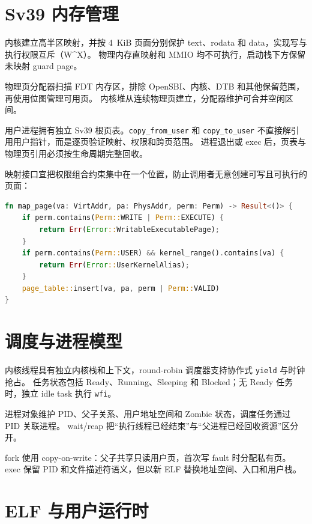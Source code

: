\section{Sv39 内存管理}

内核建立高半区映射，并按 4~KiB 页面分别保护 text、rodata 和 data，实现写与执行权限互斥（W\textasciicircum X）。
物理内存直映射和 MMIO 均不可执行，启动栈下方保留未映射 guard page。

物理页分配器扫描 FDT 内存区，排除 OpenSBI、内核、DTB 和其他保留范围，再使用位图管理可用页。
内核堆从连续物理页建立，分配器维护可合并空闲区间。

用户进程拥有独立 Sv39 根页表。\texttt{copy\_from\_user} 和 \texttt{copy\_to\_user} 不直接解引用用户指针，而是逐页验证映射、权限和跨页范围。
进程退出或 exec 后，页表与物理页引用必须按生命周期完整回收。

映射接口宜把权限组合约束集中在一个位置，防止调用者无意创建可写且可执行的页面：

\begin{lstlisting}[language=Rust,caption={页映射权限的集中校验（简化代码）}]
fn map_page(va: VirtAddr, pa: PhysAddr, perm: Perm) -> Result<()> {
    if perm.contains(Perm::WRITE | Perm::EXECUTE) {
        return Err(Error::WritableExecutablePage);
    }
    if perm.contains(Perm::USER) && kernel_range().contains(va) {
        return Err(Error::UserKernelAlias);
    }
    page_table::insert(va, pa, perm | Perm::VALID)
}
\end{lstlisting}

\section{调度与进程模型}

内核线程具有独立内核栈和上下文，round-robin 调度器支持协作式 \texttt{yield} 与时钟抢占。
任务状态包括 Ready、Running、Sleeping 和 Blocked；无 Ready 任务时，独立 idle task 执行 \texttt{wfi}。

进程对象维护 PID、父子关系、用户地址空间和 Zombie 状态，调度任务通过 PID 关联进程。
wait/reap 把“执行线程已经结束”与“父进程已经回收资源”区分开。

fork 使用 copy-on-write：父子共享只读用户页，首次写 fault 时分配私有页。
exec 保留 PID 和文件描述符语义，但以新 ELF 替换地址空间、入口和用户栈。

\section{ELF 与用户运行时}

